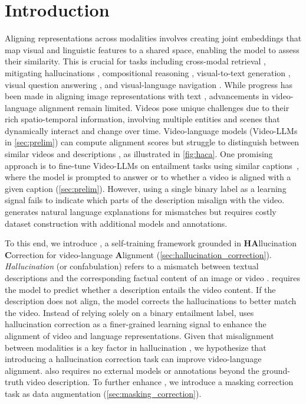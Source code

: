\section{Introduction}
\label{sec:intro}


Aligning representations across modalities involves creating joint embeddings that map visual and linguistic features to a shared space, enabling the model to assess their similarity.
This is crucial for tasks including cross-modal retrieval \cite{xu2016msr}, mitigating hallucinations \cite{jiang2024hallucination},
compositional reasoning \cite{cascante2024natural}, 
visual-to-text generation \cite{blip2}, visual question answering \cite{shen2022how}, and visual-language navigation \cite{zhao2021evaluation}.
While progress has been made in aligning image representations with text \cite{li2020oscar, zeng2021multi, wang2023image, lin2025evaluating}, advancements in video-language alignment remain limited.
Videos pose unique challenges due to their rich spatio-temporal information, involving multiple entities and scenes that dynamically interact and change over time.
Video-language models (Video-LLMs in \autoref{sec:prelim}) can compute alignment scores \cite{lin2023video, li2023videochat} but struggle to distinguish between similar videos and descriptions \cite{park2022exposing, wang2023paxion, saravanan2024velociti},
as illustrated in \autoref{fig:haca}. 
One promising approach is to fine-tune Video-LLMs on entailment tasks using similar captions~\cite{bansal2024videocon}, where the model is prompted to answer  or  to whether a video is aligned with a given caption (\autoref{sec:prelim}). 
However, using a single binary label as a learning signal fails to indicate which parts of the description misalign with the video. 
\citet{bansal2024videocon} generates natural language explanations for mismatches but requires costly dataset construction with additional models and annotations.



To this end, we introduce \textbf{\method{}}, a self-training framework grounded in \textbf{HA}llucination \textbf{C}orrection for video-language \textbf{A}lignment (\autoref{sec:hallucination_correction}).
\textit{Hallucination} (or confabulation) refers to a mismatch between textual descriptions and the corresponding factual content of an image or video \cite{liu2024survey}.
\method{} requires the model to predict whether a description entails the video content. If the description does not align, the model corrects the hallucinations to better match the video.
Instead of relying solely on a binary entailment label, \method{} uses hallucination correction as a finer-grained learning signal to enhance the alignment of video and language representations.
Given that misalignment between modalities is a key factor in hallucination \cite{biten2022let, sun-etal-2024-aligning}, we hypothesize that introducing a hallucination correction task can improve video-language alignment.
\method{} also requires no external models or annotations beyond the ground-truth video description. 
To further enhance \method{}, we introduce a masking correction task as data augmentation
(\autoref{sec:masking_correction}).

